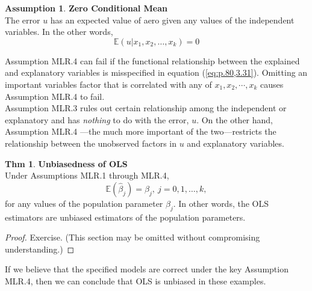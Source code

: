 \documentclass[a4paper, 10pt]{article}
\theoremstyle{definition}	%
\newtheorem{theorem}{Thm}
\newtheorem{assumption}{Assumption}
\begin{document}
\begin{assumption}
    \textbf{Zero Conditional Mean}\\
    The error $u$ has an expected value of aero given any values of the independent variables. In the other words, 
    \begin{equation}
        \mathbb{E}(u|x_1, x_2, \dots, x_k) = 0 \label{eq:p82,3.36}
    \end{equation}
\end{assumption}
Assumption MLR.4 can fail if the functional relationship between the explained and explanatory variables is misspecified in equation (\ref{eq:p.80,3.31}). Omitting an important variables factor that is correlated with any of $x_1, x_2, \cdots, x_k$ causes Assumption MLR.4 to fail.\\
Assumption MLR.3 rules out certain relationship among the independent or explanatory and has \textit{nothing} to do with the error, $u$. On the other hand, Assumption MLR.4 ---the much more important of the two---restricts the relationship between the unobserved factors in $u$ and explanatory variables.

\begin{theorem}
    \textbf{Unbiasedness of OLS} \\
    Under Assumptions MLR.1 through MLR.4,
    \begin{equation}
        \mathbb{E}(\hat{\beta}_j) = \beta_j, \ j = 0, 1, \ldots, k, \label{eq:p.83,3.37}
    \end{equation}
    for any values of the population parameter $\beta_j$. In other words, the OLS estimators are unbiased estimators of the population parameters.
\end{theorem}
\begin{proof}
    Exercise. (This section may be omitted without compromising understanding.)
\end{proof}
If we believe that the specified models are correct under the key Assumption MLR.4, then we can conclude that OLS is unbiased in these examples.
\end{document}
